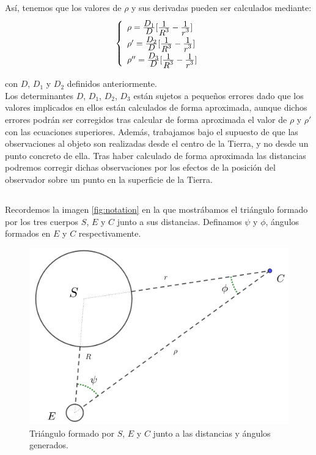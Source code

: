 \documentclass[11pt]{article}
\newcommand\ddfrac[2]{\frac{\displaystyle #1}{\displaystyle #2}}
\begin{document}
Así, tenemos que los valores de $\rho$ y sus derivadas pueden ser calculados mediante:
\begin{align}
\left\{
\def\arraystretch{1.5}
\begin{array}{l}
	\rho   = \ddfrac{D_1}{D}[\ddfrac{1}{R^3}-\ddfrac{1}{r^3}]\\
	\rho'  = \ddfrac{D_2}{D}[\ddfrac{1}{R^3}-\ddfrac{1}{r^3}]\\
	\rho'' = \ddfrac{D_3}{D}[\ddfrac{1}{R^3}-\ddfrac{1}{r^3}]
\end{array}
\right.
\label{eq:rho_values}
\end{align}

\noindent con $D$, $D_1$ y $D_2$ definidos anteriormente.\\

Los determinantes $D$, $D_1$, $D_2$, $D_3$ están sujetos a pequeños errores dado que los valores implicados en ellos están calculados de forma aproximada, aunque dichos errores podrán ser corregidos tras calcular de forma aproximada el valor de $\rho$ y $\rho'$ con las ecuaciones superiores. Además, trabajamos bajo el supuesto de que las observaciones al objeto son realizadas desde el centro de la Tierra, y no desde un punto concreto de ella. Tras haber calculado de forma aproximada las distancias podremos corregir dichas observaciones por los efectos de la posición del observador sobre un punto en la superficie de la Tierra.\\


\subsection{}
\label{subsec:distancias_r_rho}
Recordemos la imagen \ref{fig:notation} en la que mostrábamos el triángulo formado por los tres cuerpos $S$, $E$ y $C$ junto a sus distancias. Definamos $\psi$ y $\phi$, ángulos formados en $E$ y $C$ respectivamente.

\begin{figure}[H]
\centering
\includegraphics[scale=0.15]{images/notation_angles.png}
\caption{Triángulo formado por $S$, $E$ y $C$ junto a las distancias y ángulos generados.}
\label{fig:notation_angles}
\end{figure}
\end{document}

